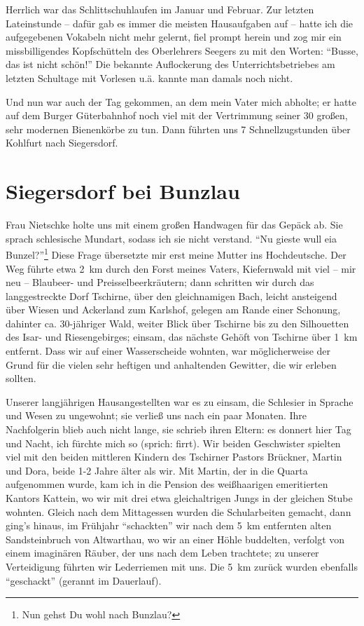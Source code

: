\documentclass[a5paper,pagesize,10pt,twoside=true]{scrbook}
\renewcommand{\marginpar}[2][]{}
\begin{document}
Herrlich war das Schlittschuhlaufen im Januar und Februar. Zur letzten Lateinstunde -- dafür gab es immer die meisten Hausaufgaben auf -- hatte ich die aufgegebenen Vokabeln nicht mehr gelernt, fiel prompt herein und zog mir ein missbilligendes Kopfschütteln des Oberlehrers Seegers zu mit den Worten: \enquote{Busse, das ist nicht schön!} Die bekannte Auflockerung des Unterrichtsbetriebes am letzten Schultage mit Vorlesen u.ä. kannte man damals noch nicht.

Und nun war auch der Tag gekommen, an dem mein Vater mich abholte; er hatte auf dem Burger Güterbahnhof noch viel mit der Vertrimmung seiner 30 großen, sehr modernen Bienenkörbe zu tun. Dann führten uns 7 Schnellzugstunden über Kohlfurt nach Siegersdorf.


\marginpar{38}
\section{Siegersdorf bei Bunzlau}
Frau Nietschke holte uns mit einem großen Handwagen für das Gepäck ab. Sie sprach schlesische Mundart, sodass ich sie nicht verstand. \enquote{Nu gieste wull eia Bunzel?}\footnote{Nun gehst Du wohl nach Bunzlau?} Diese Frage übersetzte mir erst meine Mutter ins Hochdeutsche. Der Weg führte etwa 2~km durch den Forst meines Vaters, Kiefernwald mit viel -- mir neu -- Blaubeer- und Preisselbeerkräutern; dann schritten wir durch das langgestreckte Dorf Tschirne, über den gleichnamigen Bach, leicht ansteigend über Wiesen und Ackerland zum Karlshof, gelegen am Rande einer Schonung, dahinter ca. 30-jähriger Wald, weiter Blick über Tschirne bis zu den Silhouetten des Isar- und Riesengebirges; einsam, das nächste Gehöft von Tschirne über 1~km entfernt. Dass wir auf einer Wasserscheide wohnten, war möglicherweise der Grund für die vielen sehr heftigen und anhaltenden Gewitter, die wir erleben sollten.

Unserer langjährigen Hausangestellten war es zu einsam, die Schlesier in Sprache und Wesen zu ungewohnt; sie verließ uns nach ein paar Monaten. Ihre Nachfolgerin blieb auch nicht lange, sie schrieb ihren Eltern: es donnert hier Tag und Nacht, ich fürchte mich so (sprich: firrt). Wir beiden Geschwister spielten viel mit den beiden mittleren Kindern des Tschirner Pastors Brückner, Martin und Dora, beide 1-2 Jahre älter als wir. Mit Martin, der in die Quarta aufgenommen wurde, kam ich in die Pension des weißhaarigen emeritierten Kantors Kattein, wo wir mit drei etwa gleichaltrigen Jungs in der gleichen Stube wohnten. Gleich nach dem Mittagessen wurden die Schularbeiten gemacht, dann ging's hinaus, im Frühjahr \enquote{schackten} wir nach dem 5~km entfernten alten Sandsteinbruch von Altwarthau, wo wir an einer Höhle buddelten, verfolgt von einem imaginären Räuber, der uns nach dem Leben trachtete; zu unserer Verteidigung führten wir Lederriemen mit uns. Die 5~km zurück wurden ebenfalls \enquote{geschackt} (gerannt im Dauerlauf).
\end{document}
